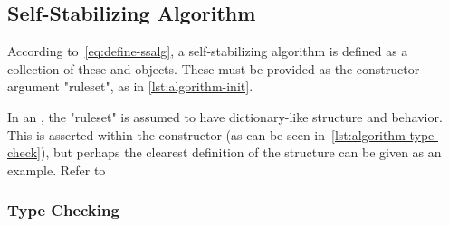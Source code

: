 \subsection{Self-Stabilizing Algorithm}
\label{sec:logic-repr:self-stab-algor}

According to~\eqref{eq:define-ssalg},
  a self-stabilizing algorithm is defined as a collection
  of these  and  objects.
These must be provided as the constructor argument "ruleset",
  as in \autoref{lst:algorithm-init}.

In an , the "ruleset" is assumed to have
  dictionary-like structure and behavior.
This is asserted within the constructor (as can be seen in~\autoref{lst:algorithm-type-check}),
  but perhaps the clearest definition of the structure can be given as an example.
Refer to


\subsubsection{Type Checking}
\label{sec:logic-repr:self-stab-algor:type-checking}

